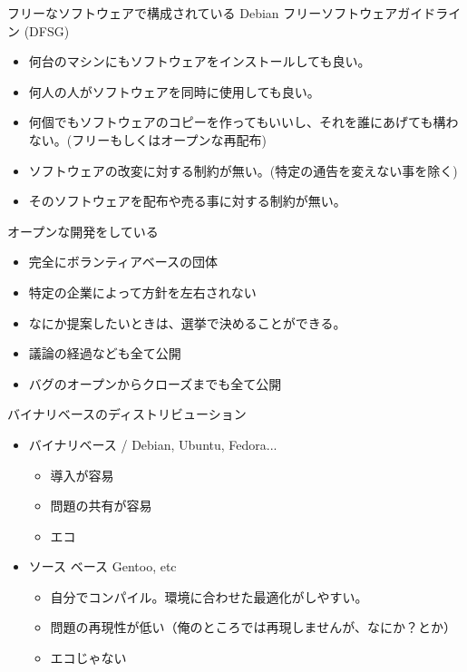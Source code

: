 \begin{frame}{フリーなソフトウェアで構成されている}
Debian フリーソフトウェアガイドライン (DFSG) 

\begin{itemize}
\item 何台のマシンにもソフトウェアをインストールしても良い。
\item 何人の人がソフトウェアを同時に使用しても良い。
\item 何個でもソフトウェアのコピーを作ってもいいし、それを誰にあげても構わない。(フリーもしくはオープンな再配布)
\item ソフトウェアの改変に対する制約が無い。(特定の通告を変えない事を除く)
\item そのソフトウェアを配布や売る事に対する制約が無い。
\end{itemize}
\end{frame}

\begin{frame}{オープンな開発をしている}

\begin{itemize}
\item 完全にボランティアベースの団体
\item 特定の企業によって方針を左右されない
\item なにか提案したいときは、選挙で決めることができる。
\item 議論の経過なども全て公開
\item バグのオープンからクローズまでも全て公開
\end{itemize}

\end{frame}


\begin{frame}{バイナリベースのディストリビューション}

\begin{itemize}
\item バイナリベース / Debian, Ubuntu, Fedora...
\begin{itemize}
\item 導入が容易
\item 問題の共有が容易
\item エコ
\end{itemize}
\item ソース ベース Gentoo, etc
\begin{itemize}
\item 自分でコンパイル。環境に合わせた最適化がしやすい。
\item 問題の再現性が低い（俺のところでは再現しませんが、なにか？とか）
\item エコじゃない
\end{itemize}
\end{itemize}
\end{frame}

